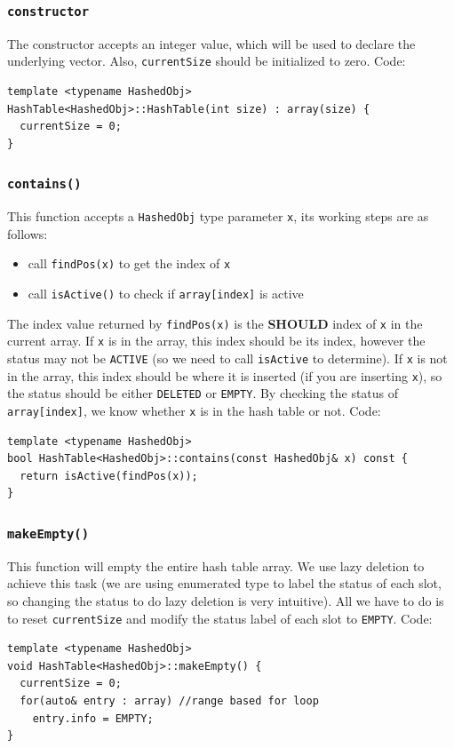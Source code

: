 \documentclass[12pt]{book}
\begin{document}
\subsubsection{\texttt{constructor}}
\label{sec:org7030530}
The constructor accepts an integer value, which will be used to declare the underlying vector. Also, \texttt{currentSize} should be initialized to zero. Code:
\begin{verbatim}
template <typename HashedObj>
HashTable<HashedObj>::HashTable(int size) : array(size) {
  currentSize = 0;
}
\end{verbatim}

\subsubsection{\texttt{contains()}}
\label{sec:org7578533}
This function accepts a \texttt{HashedObj} type parameter \texttt{x}, its working steps are as follows:
\begin{itemize}
\item call \texttt{findPos(x)} to get the index of \texttt{x}
\item call \texttt{isActive()} to check if \texttt{array[index]} is active
\end{itemize}

The index value returned by \texttt{findPos(x)} is the \textbf{SHOULD} index of \texttt{x} in the current array. If \texttt{x} is in the array, this index should be its index, however the status may not be \texttt{ACTIVE} (so we need to call \texttt{isActive} to determine). If \texttt{x} is not in the array, this index should be where it is inserted (if you are inserting \texttt{x}), so the status should be either \texttt{DELETED} or \texttt{EMPTY}. By checking the status of \texttt{array[index]}, we know whether \texttt{x} is in the hash table or not. Code:
\begin{verbatim}
template <typename HashedObj>
bool HashTable<HashedObj>::contains(const HashedObj& x) const {
  return isActive(findPos(x));
}
\end{verbatim}

\subsubsection{\texttt{makeEmpty()}}
\label{sec:org5c75eb6}
This function will empty the entire hash table array. We use lazy deletion to achieve this task (we are using enumerated type to label the status of each slot, so changing the status to do lazy deletion is very intuitive). All we have to do is to reset \texttt{currentSize} and modify the status label of each slot to \texttt{EMPTY}. Code:
\begin{verbatim}
template <typename HashedObj>
void HashTable<HashedObj>::makeEmpty() {
  currentSize = 0;
  for(auto& entry : array) //range based for loop
    entry.info = EMPTY;
}
\end{verbatim}
\end{document}
